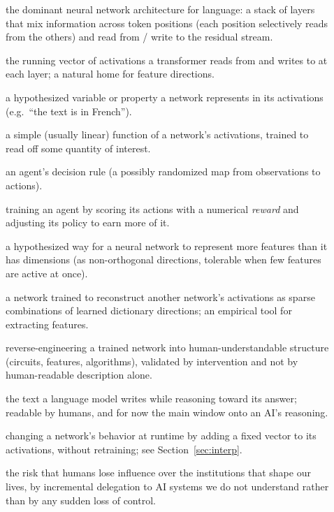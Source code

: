 \begin{description}
\item[] the dominant neural network architecture for language: a stack of layers that mix information across token positions (each position selectively reads from the others) and read from / write to the residual stream.
\item[] the running vector of activations a transformer reads from and writes to at each layer; a natural home for feature directions.
\item[] a hypothesized variable or property a network represents in its activations (e.g.\ ``the text is in French'').
\item[] a simple (usually linear) function of a network's activations, trained to read off some quantity of interest.
\item[] an agent's decision rule (a possibly randomized map from observations to actions).
\item[] training an agent by scoring its actions with a numerical \emph{reward} and adjusting its policy to earn more of it.
\item[] a hypothesized way for a neural network to represent more features than it has dimensions (as non-orthogonal directions, tolerable when few features are active at once).
\item[] a network trained to reconstruct another network's activations as sparse combinations of learned dictionary directions; an empirical tool for extracting features.
\item[] reverse-engineering a trained network into human-understandable structure (circuits, features, algorithms), validated by intervention and not by human-readable description alone.
\item[] the text a language model writes while reasoning toward its answer; readable by humans, and for now the main window onto an AI's reasoning.
\item[] changing a network's behavior at runtime by adding a fixed vector to its activations, without retraining; see Section~\ref{sec:interp}.
\item[] the risk that humans lose influence over the institutions that shape our lives, by incremental delegation to AI systems we do not understand rather than by any sudden loss of control.
\end{description}

